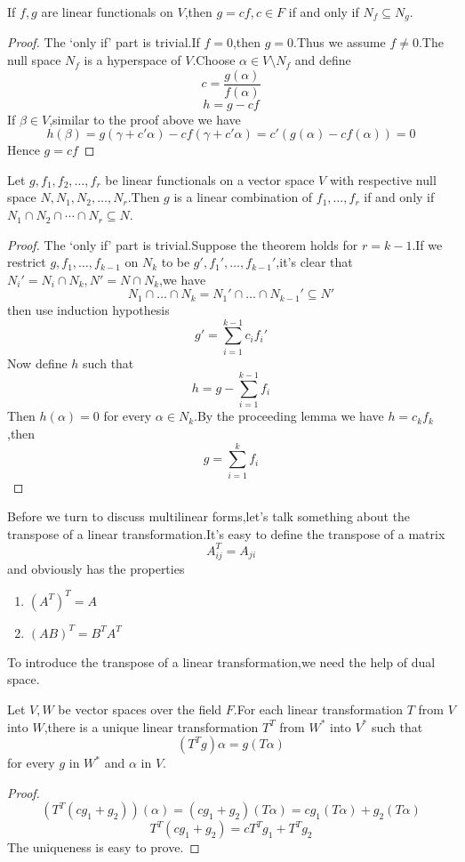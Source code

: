 \documentclass{article}
\begin{document}
\begin{lem}
	If $f,g$ are linear functionals on $V$,then $g=cf,c\in F$ if and only if $N_f\subseteq N_g$.
\end{lem}
\begin{proof}
	The `only if' part is trivial.If $f=0$,then $g=0$.Thus we assume $f\neq0$.The null space $N_f$ is a hyperspace of $V$.Choose $\alpha\in V\setminus N_f$ and define
	\[c=\frac{g(\alpha)}{f(\alpha)}\]
	\[h=g-cf\]
	If $\beta\in V$,similar to the proof above we have
	\[h(\beta)=g(\gamma+c'\alpha)-cf(\gamma+c'\alpha)=c'(g(\alpha)-cf(\alpha))=0\]
	Hence $g=cf$
\end{proof}
\begin{thm}
	Let $g,f_1,f_2,\dots,f_r$ be linear functionals on a vector space $V$ with respective null space $N,N_1,N_2,\dots,N_r$.Then $g$ is a linear combination of $f_1,\dots,f_r$ if and only if $N_1\cap N_2\cap\cdots\cap N_r\subseteq N$.
\end{thm}
\begin{proof}
	The `only if' part is trivial.Suppose the theorem holds for $r=k-1$.If we restrict $g,f_1,\dots,f_{k-1}$ on $N_k$ to be $g',f_1',\dots,f_{k-1}'$,it's clear that $N_i'=N_i\cap N_k,N'=N\cap N_k$,we have
	\[N_1\cap\dots\cap N_k=N_1'\cap\dots\cap N_{k-1}'\subseteq N'\]
	then use induction hypothesis
	\[g'=\sum\limits_{i=1}^{k-1}c_if_i'\]
	Now define $h$ such that
	\[h=g-\sum\limits_{i=1}^{k-1}f_i\]
	Then $h(\alpha)=0$ for every $\alpha\in N_k$.By the proceeding lemma we have $h=c_kf_k$,then
	\[g=\sum\limits_{i=1}^kf_i\] 
\end{proof}
Before we turn to discuss multilinear forms,let's talk something about the transpose of a linear transformation.It's easy to define the transpose of a matrix
\[A^T_{ij}=A_{ji}\]
and obviously has the properties
\begin{enumerate}
	\item $(A^T)^T=A$
	\item $(AB)^T=B^TA^T$
\end{enumerate}
\indent To introduce the transpose of a linear transformation,we need the help of dual space.
\begin{thm}
	Let $V,W$ be vector spaces over the field $F$.For each linear transformation $T$ from $V$ into $W$,there is a unique linear transformation $T^T$ from $W^*$ into $V^*$ such that
	\[(T^Tg)\alpha=g(T\alpha)\]
	for every $g$ in $W^*$ and $\alpha$ in $V$. 
\end{thm}
\begin{proof}
	\[(T^T(cg_1+g_2))(\alpha)=(cg_1+g_2)(T\alpha)=cg_1(T\alpha)+g_2(T\alpha)\]
	\[T^T(cg_1+g_2)=cT^Tg_1+T^Tg_2\]
	The uniqueness is easy to prove.
\end{proof}
\end{document}
